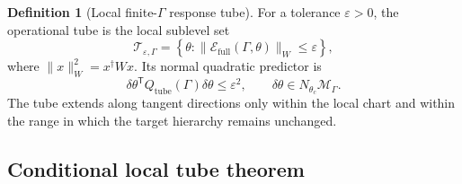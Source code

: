\documentclass[11pt]{article}
\theoremstyle{definition}
\newtheorem{definition}[theorem]{Definition}
\theoremstyle{remark}
\newcommand{\eps}{\varepsilon}
\newcommand{\cM}{\mathcal M}
\newcommand{\cT}{\mathcal T}
\newcommand{\cE}{\mathcal E}
\begin{document}
\begin{definition}[Local finite-$\Gamma$ response tube]\label{def:response-tube}
For a tolerance $\eps>0$, the operational tube is the local sublevel set
\begin{equation}
\cT_{\eps,\Gamma}
=
\left\{
\theta:
\|\cE_{\mathrm{full}}(\Gamma,\theta)\|_W
\le\eps
\right\},
\label{eq:operational-tube}
\end{equation}
where $\|x\|_W^2=x^\dagger Wx$. Its normal quadratic predictor is
\begin{equation}
\delta\theta^{\mathsf T}
Q_{\mathrm{tube}}(\Gamma)
\delta\theta
\le\eps^2,
\qquad
\delta\theta\in N_{\theta_c}\cM_\Gamma.
\label{eq:tube-ellipsoid}
\end{equation}
The tube extends along tangent directions only within the local chart and within the range in which the target hierarchy remains unchanged.
\end{definition}

\subsection{Conditional local tube theorem}
\end{document}
